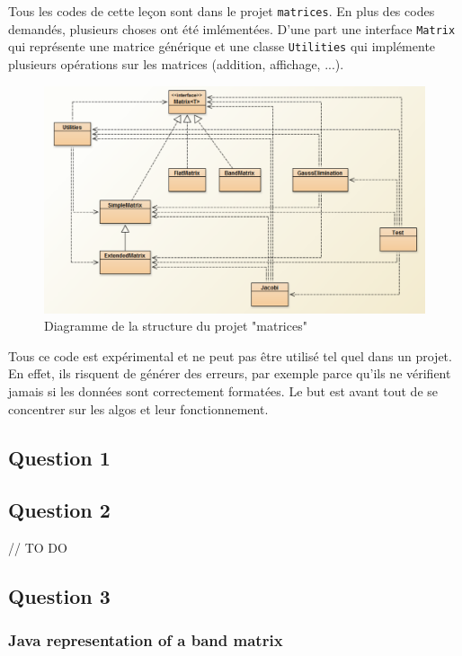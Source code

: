 Tous les codes de cette leçon sont dans le projet \texttt{matrices}. En plus des codes demandés, plusieurs choses ont été imlémentées. D'une part une interface \texttt{Matrix} qui représente une matrice générique et une classe \texttt{Utilities} qui implémente plusieurs opérations sur les matrices (addition, affichage, ...).

\begin{figure}[H]
	\caption{\label{struc} Diagramme de la structure du projet "matrices"}
	\centering
	\includegraphics[scale = 0.6]{2_structure.png}
\end{figure}

Tous ce code est expérimental et ne peut pas être utilisé tel quel dans un projet. En effet, ils risquent de générer des erreurs, par exemple parce qu'ils ne vérifient jamais si les données sont correctement formatées. Le but est avant tout de se concentrer sur les algos et leur fonctionnement.

\subsection{Question 1}

\subsection{Question 2}

// TO DO

\subsection{Question 3}

\subsubsection{Java representation of a band matrix}

